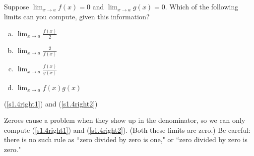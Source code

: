 %
%

\subsection*{\Conceptual}
\begin{Mquestion}Suppose $\displaystyle\lim_{x \rightarrow a} f(x)=0$ and
$\displaystyle\lim_{x \rightarrow a} g(x)=0$. Which of the following limits can you compute, given this information?
\begin{enumerate}[(a)]
\item\label{s1.4right1} $\displaystyle\lim_{x \rightarrow a} \frac{f(x)}{2}$
\item $\displaystyle\lim_{x \rightarrow a} \frac{2}{f(x)}$
\item $\displaystyle\lim_{x \rightarrow a} \frac{f(x)}{g(x)}$
\item\label{s1.4right2} $\displaystyle\lim_{x \rightarrow a} f(x)g(x)$
\end{enumerate}
\end{Mquestion}
\begin{answer}
(\ref{s1.4right1}) and (\ref{s1.4right2})
\end{answer}
\begin{solution}
Zeroes cause a problem when they show up in the denominator, so we can only compute
(\ref{s1.4right1}) and (\ref{s1.4right2}). (Both these limits are zero.) Be careful: there is no such rule as ``zero divided by zero is one," or ``zero divided by zero is zero."
\end{solution}


